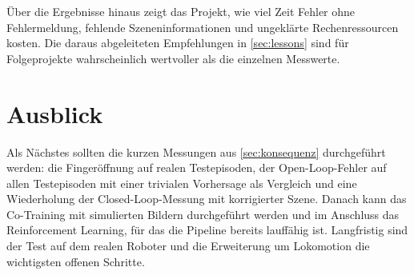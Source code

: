 Über die Ergebnisse hinaus zeigt das Projekt, wie viel Zeit Fehler ohne
Fehlermeldung, fehlende Szeneninformationen und ungeklärte Rechenressourcen
kosten. Die daraus abgeleiteten Empfehlungen in \cref{sec:lessons} sind für
Folgeprojekte wahrscheinlich wertvoller als die einzelnen Messwerte.

\section{Ausblick}
\label{sec:ausblick}

Als Nächstes sollten die kurzen Messungen aus \cref{sec:konsequenz}
durchgeführt werden: die Fingeröffnung auf realen Testepisoden, der
Open-Loop-Fehler auf allen Testepisoden mit einer trivialen Vorhersage als
Vergleich und eine Wiederholung der Closed-Loop-Messung mit korrigierter
Szene. Danach kann das Co-Training mit simulierten Bildern durchgeführt werden
und im Anschluss das Reinforcement Learning, für das die Pipeline bereits
lauffähig ist. Langfristig sind der Test auf dem realen Roboter und die
Erweiterung um Lokomotion die wichtigsten offenen Schritte.
